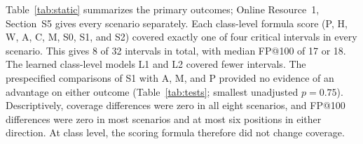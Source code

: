 \documentclass[pdflatex,sn-basic,Numbered]{sn-jnl}
\newcommand{\NCriticalIntervals}{32}
\newcommand{\StaticClassCovered}{8}
\newcommand{\StaticClassFPMedian}{18}
\newcommand{\PrimaryMinP}{0.75}
\begin{document}
Table~\ref{tab:static} summarizes the primary outcomes; Online Resource~1, Section~S5 gives every scenario separately. Each class-level formula score (P, H, W, A, C, M, S0, S1, and S2) covered exactly one of four critical intervals in every scenario. This gives \StaticClassCovered{} of \NCriticalIntervals{} intervals in total, with median FP@100 of 17 or \StaticClassFPMedian. The learned class-level models L1 and L2 covered fewer intervals. The prespecified comparisons of S1 with A, M, and P provided no evidence of an advantage on either outcome (Table~\ref{tab:tests}; smallest unadjusted $p = \PrimaryMinP$). Descriptively, coverage differences were zero in all eight scenarios, and FP@100 differences were zero in most scenarios and at most six positions in either direction. At class level, the scoring formula therefore did not change coverage.
\end{document}
